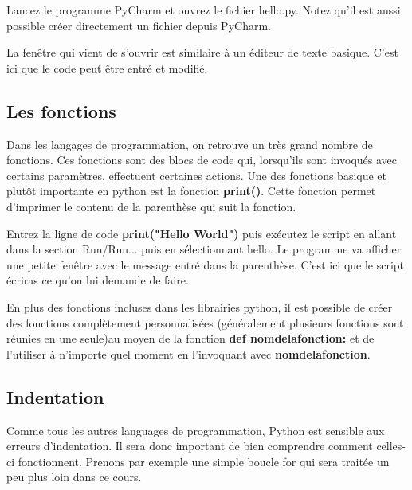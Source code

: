\begin{conseil}

Lancez le programme PyCharm et ouvrez le fichier hello.py. Notez qu'il est aussi possible créer directement un fichier depuis PyCharm.
 
\end {conseil}

La fenêtre qui vient de s'ouvrir est similaire à un éditeur de texte basique. C'est ici que le code peut être entré et modifié.

\subsection{Les fonctions}

Dans les langages de programmation, on retrouve un très grand nombre de fonctions. Ces fonctions sont des blocs de code qui, lorsqu'ils sont invoqués avec certains paramètres, effectuent certaines actions.
Une des fonctions basique et plutôt importante en python est la fonction \textbf{print()}.  Cette fonction permet d'imprimer le contenu de la parenthèse qui suit la fonction.

\begin{conseil}

Entrez la ligne de code \textbf{print("Hello World")} puis exécutez le script en allant dans la section Run/Run... puis en sélectionnant hello. Le programme va afficher une petite fenêtre avec le message entré dans la parenthèse. C'est ici que le script écriras ce qu'on lui demande de faire.

\end{conseil}

En plus des fonctions incluses dans les librairies python, il est possible de créer des fonctions complètement personnalisées (généralement plusieurs fonctions sont réunies en une seule)au moyen de la fonction \textbf{def nomdelafonction:} et de l'utiliser à n'importe quel moment en l'invoquant avec \textbf{nomdelafonction}.

\begin{solution}

\end{solution}

\subsection{Indentation}

Comme tous les autres languages de programmation, Python est sensible aux erreurs d'indentation. Il sera donc important de bien comprendre comment celles-ci fonctionnent. Prenons par exemple une simple boucle for qui sera traitée un peu plus loin dans ce cours.



